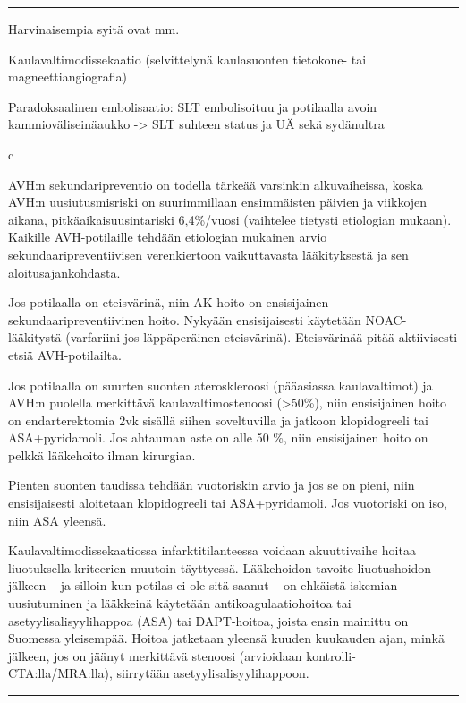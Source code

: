 \documentclass[
]{book}
\begin{document}
\begin{center}\rule{0.5\linewidth}{0.5pt}\end{center}

Harvinaisempia syitä ovat mm.

Kaulavaltimodissekaatio (selvittelynä kaulasuonten tietokone- tai magneettiangiografia)

Paradoksaalinen embolisaatio: SLT embolisoituu ja potilaalla avoin kammioväliseinäaukko -\textgreater{} SLT suhteen status ja UÄ sekä sydänultra

c

AVH:n sekundaripreventio on todella tärkeää varsinkin alkuvaiheissa, koska AVH:n uusiutusmisriski on suurimmillaan ensimmäisten päivien ja
viikkojen aikana, pitkäaikaisuusintariski 6,4\%/vuosi (vaihtelee tietysti etiologian mukaan). Kaikille AVH-potilaille tehdään etiologian mukainen arvio sekundaaripreventiivisen verenkiertoon vaikuttavasta lääkityksestä ja sen aloitusajankohdasta.

Jos potilaalla on eteisvärinä, niin AK-hoito on ensisijainen sekundaaripreventiivinen hoito. Nykyään ensisijaisesti käytetään NOAC-lääkitystä (varfariini jos läppäperäinen eteisvärinä). Eteisvärinää pitää aktiivisesti etsiä AVH-potilailta.

Jos potilaalla on suurten suonten ateroskleroosi (pääasiassa kaulavaltimot) ja AVH:n puolella merkittävä kaulavaltimostenoosi (\textgreater50\%), niin ensisijainen hoito on endarterektomia 2vk sisällä siihen soveltuvilla ja jatkoon klopidogreeli tai ASA+pyridamoli. Jos ahtauman aste on alle 50 \%, niin ensisijainen hoito on pelkkä lääkehoito ilman kirurgiaa.

Pienten suonten taudissa tehdään vuotoriskin arvio ja jos se on pieni, niin ensisijaisesti aloitetaan klopidogreeli tai ASA+pyridamoli. Jos vuotoriski on iso, niin ASA yleensä.

Kaulavaltimodissekaatiossa infarktitilanteessa voidaan akuuttivaihe hoitaa liuotuksella kriteerien muutoin täyttyessä. Lääkehoidon tavoite liuotushoidon jälkeen -- ja silloin kun potilas ei ole sitä saanut -- on ehkäistä iskemian uusiutuminen ja lääkkeinä käytetään antikoagulaatiohoitoa tai asetyylisalisyylihappoa (ASA) tai DAPT-hoitoa, joista ensin mainittu on Suomessa yleisempää. Hoitoa jatketaan yleensä kuuden kuukauden ajan, minkä jälkeen, jos on jäänyt merkittävä stenoosi (arvioidaan kontrolli-CTA:lla/MRA:lla), siirrytään asetyylisalisyylihappoon.

\begin{center}\rule{0.5\linewidth}{0.5pt}\end{center}
\end{document}
